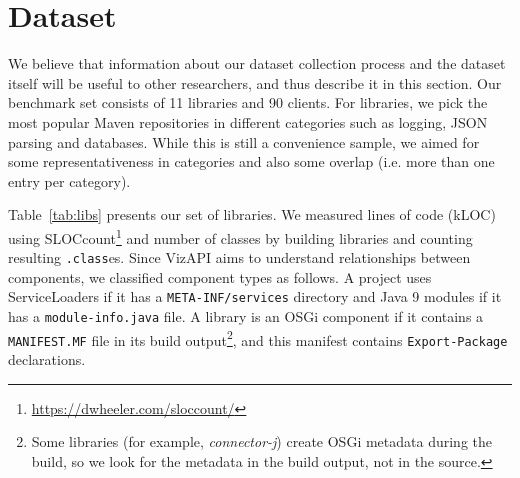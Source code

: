 \section{Dataset}
\label{sec:benchmark}
We believe that information about our dataset collection process and the dataset itself will be useful to other researchers, and thus describe it in this section. Our benchmark set consists of 11 libraries and 90 clients. For libraries, we pick the most popular Maven 
repositories in different categories such as logging, JSON parsing and databases. While this is still a convenience sample, we aimed for some representativeness in categories and also some overlap (i.e. more than one entry per category).

Table~\ref{tab:libs} presents our set of libraries. We measured lines of code (kLOC) using SLOCcount\footnote{\url{https://dwheeler.com/sloccount/}} and number of classes by building libraries and counting resulting \texttt{.class}es. Since VizAPI aims to understand relationships between components, we classified component types as follows. A project uses ServiceLoaders if it has a \texttt{META-INF/services} directory and Java 9 modules if it has a \texttt{module-info.java} file. A library is an OSGi component if it contains a \texttt{MANIFEST.MF} file in its build output\footnote{Some libraries (for example, \emph{connector-j}) create OSGi metadata during the build, so we look for the metadata in the build output, not in the source.}, and this manifest contains \texttt{Export-Package} declarations. 

